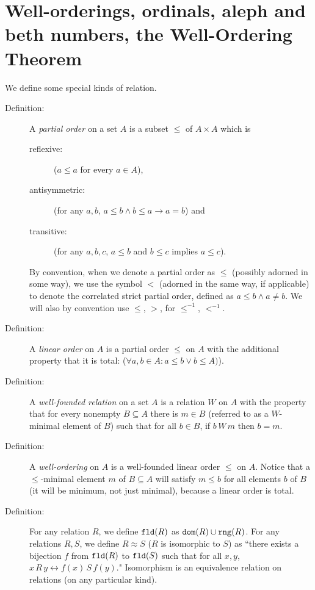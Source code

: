 \documentclass[12pt]{article}
\begin{document}
\section{Well-orderings, ordinals, aleph and beth numbers, the Well-Ordering Theorem}

We define some special kinds of relation.

\begin{description}

\item[Definition:]  A {\em partial order\/} on a set $A$ is a subset $\leq$ of $A \times A$ which is \begin{description} \item[reflexive:] ($a \leq a$ for every $a \in A$), \item[antisymmetric:]  (for any $a,b$, $a \leq b \wedge b \leq a \rightarrow a=b$) and \item[transitive:]  (for any $a,b,c$, $a \leq b$ and $b \leq c$ implies $a \leq c$).\end{description}  By convention, when we denote a partial order as $\leq$ (possibly adorned in some way), we use the symbol $<$ (adorned in the same way, if applicable) to denote the correlated strict partial order, defined as $a \leq b \wedge a \neq b$.  We will also by convention use $\leq$, $>$, for $\leq^{-1}$, $<^{-1}$.

\item[Definition:]   A {\em linear order\/} on $A$ is a partial order $\leq$ on $A$ with the additional property that it is total: ($\forall a,b\in A:a \leq b \vee b \leq A)$).


\item[Definition:]  A {\em well-founded relation\/} on a set $A$ is a relation $W$ on $A$ with the property that for every nonempty $B \subseteq A$ there is $m \in B$ (referred to as a $W$-minimal element of $B$) such that
for all $b \in B$, if $b\, W \, m$ then $b=m$.

\item[Definition:]  A {\em well-ordering\/} on $A$ is a well-founded linear order $\leq$ on $A$.  Notice that a $\leq$-minimal element $m$ of $B \subseteq A$ will satisfy $m \leq b$ for all elements $b$ of $B$ (it will be minimum, not just minimal), because a linear order is total.

\item[Definition:]  For any relation $R$, we define ${\tt fld}(R)$ as ${\tt dom}(R) \cup {\tt rng}(R)$. For any relations $R,S$, we define $R \approx S$ ($R$ is isomorphic to $S$) as ``there exists a bijection $f$ from ${\tt fld}(R)$ to ${\tt fld}(S)$ such that for all $x,y$, $x\,R\,y \leftrightarrow f(x) \,S\, f(y)$."  Isomorphism is an equivalence relation on relations (on any particular kind).


\end{description}
\end{document}
